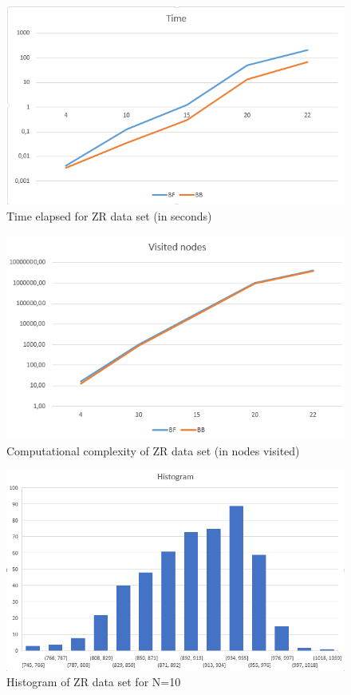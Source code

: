 \documentclass{article}
\begin{document}
\begin{figure}[H]
    \centering
    \includegraphics[width=0.8\linewidth]{ZRtime.PNG}
    \caption{Time elapsed for ZR data set (in seconds)}
\end{figure}
\begin{figure}[H]
    \centering
    \includegraphics[width=0.8\linewidth]{ZRpass.PNG}
    \caption{Computational complexity of ZR data set (in nodes visited)}
\end{figure}
\begin{figure}[H]
    \centering
    \includegraphics[width=0.8\linewidth]{ZRhistogram.PNG}
    \caption{Histogram of ZR data set for N=10 }
\end{figure}
\end{document}
